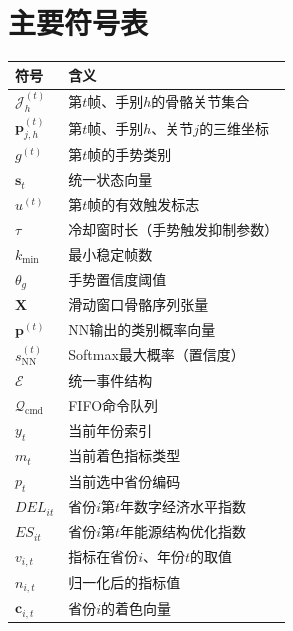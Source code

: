 \cleardoublepage
{

    \appendixsecmajornumbering

    \section{主要符号表}

    \begin{center}
        \label{tab:notation}
        \small
        \setlength{\tabcolsep}{12pt}
        \begin{tabular}{ll}
        \hline
        符号 & 含义 \\
        \hline
        $\mathcal{J}_h^{(t)}$ & 第$t$帧、手别$h$的骨骼关节集合 \\
        $\mathbf{p}_{j,h}^{(t)}$ & 第$t$帧、手别$h$、关节$j$的三维坐标 \\
        $g^{(t)}$ & 第$t$帧的手势类别 \\
        $\mathbf{s}_t$ & 统一状态向量 \\
        $u^{(t)}$ & 第$t$帧的有效触发标志 \\
        $\tau$ & 冷却窗时长（手势触发抑制参数）\\
        $k_{\min}$ & 最小稳定帧数 \\
        $\theta_g$ & 手势置信度阈值 \\
        $\mathbf{X}$ & 滑动窗口骨骼序列张量 \\
        $\mathbf{p}^{(t)}$ & NN输出的类别概率向量 \\
        $s^{(t)}_{\mathrm{NN}}$ & Softmax最大概率（置信度）\\
        $\mathcal{E}$ & 统一事件结构 \\
        $\mathcal{Q}_{\mathrm{cmd}}$ & FIFO命令队列 \\
        $y_t$ & 当前年份索引 \\
        $m_t$ & 当前着色指标类型 \\
        $p_t$ & 当前选中省份编码 \\
        $DEL_{it}$ & 省份$i$第$t$年数字经济水平指数 \\
        $ES_{it}$ & 省份$i$第$t$年能源结构优化指数 \\
        $v_{i,t}$ & 指标在省份$i$、年份$t$的取值 \\
        $n_{i,t}$ & 归一化后的指标值 \\
        $\mathbf{c}_{i,t}$ & 省份$i$的着色向量 \\
        \hline
        \end{tabular}
    \end{center}

    \removeappendixsecmajornumbering
}
